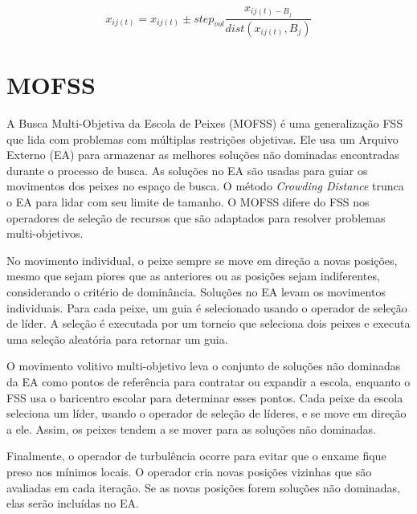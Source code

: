 \begin{equation} \label{eq:moveagain}
    x_{ij(t)} = x_{ij(t)} \pm step_{vol}\frac{x_{ij(t) - B_j}}{dist(x_{ij(t)}, B_j)}
\end{equation}


\section{MOFSS}
\label{sec-mofss}

A Busca Multi-Objetiva da Escola de Peixes (MOFSS) é uma generalização FSS que lida com problemas com múltiplas restrições objetivas. Ele usa um Arquivo Externo (EA) para armazenar as melhores soluções não dominadas encontradas durante o processo de busca. As soluções no EA são usadas para guiar os movimentos dos peixes no espaço de busca. O método \textit{Crowding Distance} trunca o EA para lidar com seu limite de tamanho. O MOFSS difere do FSS nos operadores de seleção de recursos que são adaptados para resolver problemas multi-objetivos.

No movimento individual, o peixe sempre se move em direção a novas posições, mesmo que sejam piores que as anteriores ou as posições sejam indiferentes, considerando o critério de dominância. Soluções no EA levam os movimentos individuais. Para cada peixe, um guia é selecionado usando o operador de seleção de líder. A seleção é executada por um torneio que seleciona dois peixes e executa uma seleção aleatória para retornar um guia.

O movimento volitivo multi-objetivo leva o conjunto de soluções não dominadas da EA como pontos de referência para contratar ou expandir a escola, enquanto o FSS usa o baricentro escolar para determinar esses pontos. Cada peixe da escola seleciona um líder, usando o operador de seleção de líderes, e se move em direção a ele. Assim, os peixes tendem a se mover para as soluções não dominadas.

Finalmente, o operador de turbulência ocorre para evitar que o enxame fique preso nos mínimos locais. O operador cria novas posições vizinhas que são avaliadas em cada iteração. Se as novas posições forem soluções não dominadas, elas serão incluídas no EA.
